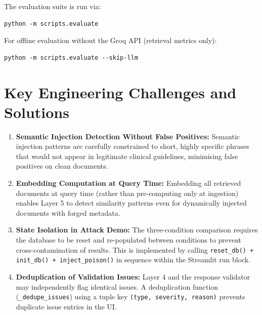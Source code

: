 The evaluation suite is run via:
\begin{verbatim}
python -m scripts.evaluate
\end{verbatim}

For offline evaluation without the Groq API (retrieval metrics only):
\begin{verbatim}
python -m scripts.evaluate --skip-llm
\end{verbatim}

\section{Key Engineering Challenges and Solutions}

\begin{enumerate}
    \item \textbf{Semantic Injection Detection Without False Positives:} Semantic injection patterns are carefully constrained to short, highly specific phrases that would not appear in legitimate clinical guidelines, minimising false positives on clean documents.
    \item \textbf{Embedding Computation at Query Time:} Embedding all retrieved documents at query time (rather than pre-computing only at ingestion) enables Layer 5 to detect similarity patterns even for dynamically injected documents with forged metadata.
    \item \textbf{State Isolation in Attack Demo:} The three-condition comparison requires the database to be reset and re-populated between conditions to prevent cross-contamination of results. This is implemented by calling \texttt{reset\_db() + init\_db() + inject\_poison()} in sequence within the Streamlit run block.
    \item \textbf{Deduplication of Validation Issues:} Layer 4 and the response validator may independently flag identical issues. A deduplication function (\texttt{\_dedupe\_issues}) using a tuple key \texttt{(type, severity, reason)} prevents duplicate issue entries in the UI.
\end{enumerate}
